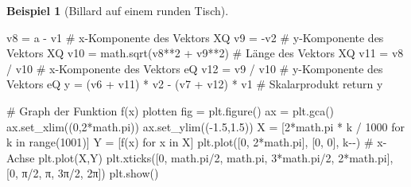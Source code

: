 \documentclass[
  letterpaper,
  DIV=11,
  oneside]{scrreprt}
\newenvironment{Shaded}{\begin{snugshade}}{\end{snugshade}}
\newcommand{\BuiltInTok}[1]{\textcolor[rgb]{0.00,0.23,0.31}{#1}}
\newcommand{\CommentTok}[1]{\textcolor[rgb]{0.37,0.37,0.37}{#1}}
\newcommand{\ControlFlowTok}[1]{\textcolor[rgb]{0.00,0.23,0.31}{#1}}
\newcommand{\DecValTok}[1]{\textcolor[rgb]{0.68,0.00,0.00}{#1}}
\newcommand{\FloatTok}[1]{\textcolor[rgb]{0.68,0.00,0.00}{#1}}
\newcommand{\KeywordTok}[1]{\textcolor[rgb]{0.00,0.23,0.31}{#1}}
\newcommand{\NormalTok}[1]{\textcolor[rgb]{0.00,0.23,0.31}{#1}}
\newcommand{\OperatorTok}[1]{\textcolor[rgb]{0.37,0.37,0.37}{#1}}
\newcommand{\StringTok}[1]{\textcolor[rgb]{0.13,0.47,0.30}{#1}}
\theoremstyle{definition}
\theoremstyle{definition}
\newtheorem{example}{Beispiel}[chapter]
\theoremstyle{remark}
\begin{document}
\begin{example}[Billard auf einem runden Tisch]
\begin{Shaded}
\begin{Highlighting}[]
\NormalTok{    v8 }\OperatorTok{=}\NormalTok{ a }\OperatorTok{{-}}\NormalTok{ v1        }\CommentTok{\# x{-}Komponente des Vektors XQ}
\NormalTok{    v9 }\OperatorTok{=} \OperatorTok{{-}}\NormalTok{v2           }\CommentTok{\# y{-}Komponente des Vektors XQ}
\NormalTok{    v10 }\OperatorTok{=}\NormalTok{ math.sqrt(v8}\OperatorTok{**}\DecValTok{2} \OperatorTok{+}\NormalTok{ v9}\OperatorTok{**}\DecValTok{2}\NormalTok{)  }\CommentTok{\# Länge des Vektors XQ}
\NormalTok{    v11 }\OperatorTok{=}\NormalTok{ v8 }\OperatorTok{/}\NormalTok{ v10     }\CommentTok{\# x{-}Komponente des Vektors eQ    }
\NormalTok{    v12 }\OperatorTok{=}\NormalTok{ v9 }\OperatorTok{/}\NormalTok{ v10     }\CommentTok{\# y{-}Komponente des Vektors eQ   }
\NormalTok{    y }\OperatorTok{=}\NormalTok{ (v6 }\OperatorTok{+}\NormalTok{ v11) }\OperatorTok{*}\NormalTok{ v2 }\OperatorTok{{-}}\NormalTok{ (v7 }\OperatorTok{+}\NormalTok{ v12) }\OperatorTok{*}\NormalTok{ v1  }\CommentTok{\# Skalarprodukt}
    \ControlFlowTok{return}\NormalTok{ y   }

\CommentTok{\# Graph der Funktion f(x) plotten}
\NormalTok{fig }\OperatorTok{=}\NormalTok{ plt.figure()}
\NormalTok{ax }\OperatorTok{=}\NormalTok{ plt.gca()}
\NormalTok{ax.set\_xlim((}\DecValTok{0}\NormalTok{,}\DecValTok{2}\OperatorTok{*}\NormalTok{math.pi))}
\NormalTok{ax.set\_ylim((}\OperatorTok{{-}}\FloatTok{1.5}\NormalTok{,}\FloatTok{1.5}\NormalTok{))}
\NormalTok{X }\OperatorTok{=}\NormalTok{ [}\DecValTok{2}\OperatorTok{*}\NormalTok{math.pi }\OperatorTok{*}\NormalTok{ k }\OperatorTok{/} \DecValTok{1000} \ControlFlowTok{for}\NormalTok{ k }\KeywordTok{in} \BuiltInTok{range}\NormalTok{(}\DecValTok{1001}\NormalTok{)]}
\NormalTok{Y }\OperatorTok{=}\NormalTok{ [f(x) }\ControlFlowTok{for}\NormalTok{ x }\KeywordTok{in}\NormalTok{ X]}
\NormalTok{plt.plot([}\DecValTok{0}\NormalTok{, }\DecValTok{2}\OperatorTok{*}\NormalTok{math.pi], [}\DecValTok{0}\NormalTok{, }\DecValTok{0}\NormalTok{], }\StringTok{\textquotesingle{}k{-}{-}\textquotesingle{}}\NormalTok{) }\CommentTok{\# x{-}Achse}
\NormalTok{plt.plot(X,Y)}
\NormalTok{plt.xticks([}\DecValTok{0}\NormalTok{, math.pi}\OperatorTok{/}\DecValTok{2}\NormalTok{, math.pi, }\DecValTok{3}\OperatorTok{*}\NormalTok{math.pi}\OperatorTok{/}\DecValTok{2}\NormalTok{, }\DecValTok{2}\OperatorTok{*}\NormalTok{math.pi],}
\NormalTok{           [}\StringTok{\textquotesingle{}0\textquotesingle{}}\NormalTok{, }\StringTok{\textquotesingle{}π/2\textquotesingle{}}\NormalTok{, }\StringTok{\textquotesingle{}π\textquotesingle{}}\NormalTok{, }\StringTok{\textquotesingle{}3π/2\textquotesingle{}}\NormalTok{, }\StringTok{\textquotesingle{}2π\textquotesingle{}}\NormalTok{])}
\NormalTok{plt.show()  }
\end{Highlighting}
\end{Shaded}


\end{example}
\end{document}
